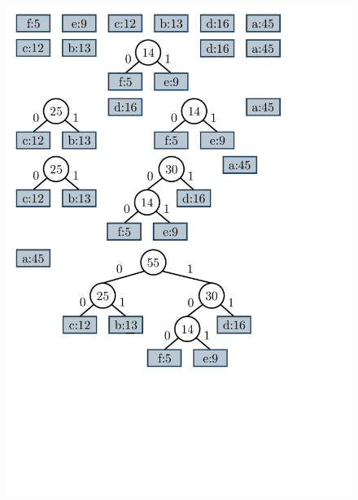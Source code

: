 \begin{figure}
    	\centering
    	\begin{minipage}{1\textwidth}
    		\centering
    		\begin{minipage}{0.45\textwidth}
    			\centering
    			\includegraphics[scale=.45, clip, trim=16 790 120 10]{img/graphs-huffman2.pdf}
    			

\end{minipage}
\end{minipage}
\end{figure}
